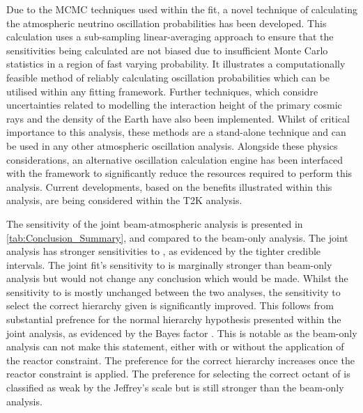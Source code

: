 Due to the MCMC techniques used within the fit, a novel technique of calculating the atmospheric neutrino oscillation probabilities has been developed. This calculation uses a sub-sampling linear-averaging approach to ensure that the sensitivities being calculated are not biased due to insufficient Monte Carlo statistics in a region of fast varying probability. It illustrates a computationally feasible method of reliably calculating oscillation probabilities which can be utilised within any fitting framework. Further techniques, which considre uncertainties related to modelling the interaction height of the primary cosmic rays and the density of the Earth have also been implemented. Whilst of critical importance to this analysis, these methods are a stand-alone technique and can be used in any other atmospheric oscillation analysis. Alongside these physics considerations, an alternative oscillation calculation engine has been interfaced with the framework to significantly reduce the resources required to perform this analysis. Current developments, based on the benefits illustrated within this analysis, are being considered within the T2K analysis.

The sensitivity of the joint beam-atmospheric analysis is presented in \autoref{tab:Conclusion_Summary}, and compared to the beam-only analysis. The joint analysis has stronger sensitivities to , as evidenced by the tighter \quickmath{1\sigma} credible intervals. The joint fit's sensitivity to  is marginally stronger than beam-only analysis but would not change any conclusion which would be made. Whilst the sensitivity to  is mostly unchanged between the two analyses, the sensitivity to select the correct hierarchy given is significantly improved. This follows from substantial prefrence for the normal hierarchy hypothesis presented within the joint analysis, as evidenced by the Bayes factor . This is notable as the beam-only analysis can not make this statement, either with or without the application of the reactor constraint. The preference for the correct hierarchy increases once the reactor constraint is applied. The preference for selecting the correct octant of  is classified as weak by the Jeffrey's scale but is still stronger than the beam-only analysis.

